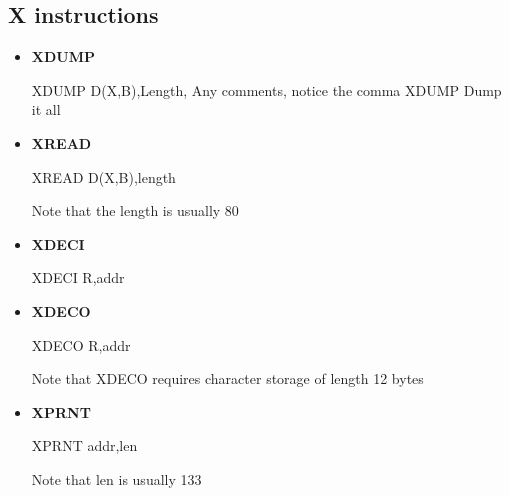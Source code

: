 \documentclass{report}
\begin{document}
    \bigbreak \noindent 
    \subsection{X instructions}
    \begin{itemize}
        \item \textbf{XDUMP}
            \bigbreak \noindent 
            \begin{cppcode}
            XDUMP   D(X,B),Length, Any comments, notice the comma
            XDUMP                Dump it all
            \end{cppcode}
        \item \textbf{XREAD}
            \bigbreak \noindent 
            \begin{cppcode}
            XREAD   D(X,B),length
            \end{cppcode}
            \bigbreak \noindent 
            Note that the length is usually 80
        \item \textbf{XDECI}
            \bigbreak \noindent 
            \begin{cppcode}
            XDECI   R,addr
            \end{cppcode}
        \item \textbf{XDECO}
            \bigbreak \noindent 
            \begin{cppcode}
            XDECO   R,addr
            \end{cppcode}
            \bigbreak \noindent 
            Note that XDECO requires character storage of length 12 bytes
        \item \textbf{XPRNT}
            \bigbreak \noindent 
            \begin{cppcode}
            XPRNT   addr,len
            \end{cppcode}
            \bigbreak \noindent 
            Note that len is usually 133
    \end{itemize}
    
\end{document}
